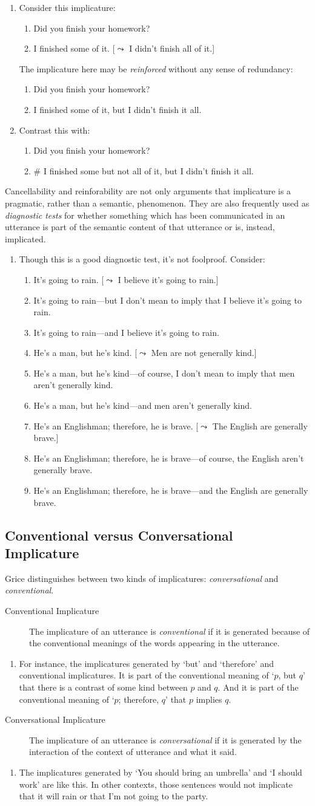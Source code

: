 \documentclass[landscape, two column, full page,reqno]{article}
\newcommand{\qe}{\begin{enumerate}[align=left,style=nextline,leftmargin=17pt,labelsep=5pt,font=\normalfont]}
\newcommand{\ze}{\end{enumerate}}
\newcommand{\p}{\item}
\newcommand{\e}{\emph}
\begin{document}
	\qe
	\p Consider this implicature:
		\qe
		\p[E:] Did you finish your homework?
		\p[F:] I finished some of it. [$\leadsto$ I didn't finish all of it.]
		\ze 
	The implicature here may be \e{reinforced} without any sense of redundancy:
		\qe
		\p[E:] Did you finish your homework?
		\p[F:] I finished some of it, but I didn't finish it all.
		\ze 
	\p Contrast this with:
		\qe
		\p[E:] Did you finish your homework?
		\p[F:] \# I finished some but not all of it, but I didn't finish it all.
		\ze 
	\ze 
\p Cancellability and reinforability are not only arguments that implicature is a pragmatic, rather than a semantic, phenomenon.  They are also frequently used as \e{diagnostic tests} for whether something which has been communicated in an utterance is part of the semantic content of that utterance or is, instead, implicated.
	\qe
	\p Though this is a good diagnostic test, it's not foolproof.  Consider:	
			\qe
			\p[] It's going to rain. [$\leadsto$ I believe it's going to rain.]
			\p[\#] It's going to rain---but I don't mean to imply that I believe it's going to rain.
			\p[??] It's going to rain---and I believe it's going to rain.
			\p[] He's a man, but he's kind. [$\leadsto$ Men are not generally kind.]
			\p[\#] He's a man, but he's kind---of course, I don't mean to imply that men aren't generally kind.
			\p[\# ] He's a man, but he's kind---and men aren't generally kind.
			\p[] He's an Englishman; therefore, he is brave. [$\leadsto$ The English are generally brave.]
			\p[\#]  He's an Englishman; therefore, he is brave---of course, the English aren't generally brave.
			\p[\#] He's an Englishman; therefore, he is brave---and the English are generally brave.
			\ze 
	\ze 
\subsection{Conventional versus Conversational Implicature}
\p Grice distinguishes between two kinds of implicatures: \e{conversational} and \e{conventional}.
	\begin{description}
	\item[Conventional Implicature] The implicature of an utterance is \e{conventional} if it is generated because of the conventional meanings of the words appearing in the utterance.
	\end{description}
	\qe
	\p For instance, the implicatures generated by `but' and `therefore' and conventional implicatures.  It is part of the conventional meaning of `$p$, but $q$' that there is a contrast of some kind between $p$ and $q$.  And it is part of the conventional meaning of  `$p$; therefore, $q$' that $p$ implies $q$.
	\ze 
	\begin{description}
	\item[Conversational Implicature]  The implicature of an utterance is \e{conversational} if it is generated by the interaction of the context of utterance and what it said.
	\end{description}
	\qe
	\p The implicatures generated by `You should bring an umbrella' and `I should work' are like this.  In other contexts, those sentences would not implicate that it will rain or that I'm not going to the party.
	\ze 
	
\end{document}
